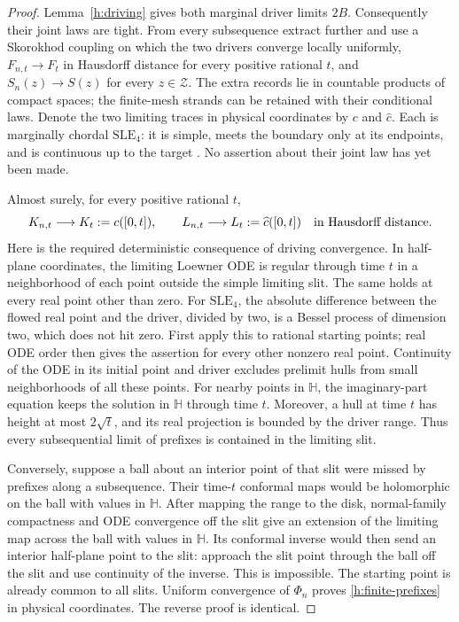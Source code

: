 \begin{proof}
Lemma~\ref{h:driving} gives both marginal driver limits $2B$.
Consequently their joint laws are tight. From every subsequence extract
further and use a Skorokhod coupling on which the two drivers converge
locally uniformly, $F_{n,t}\to F_t$ in Hausdorff distance for every
positive rational $t$, and $S_n(z)\to S(z)$ for every $z\in\mathcal Z$.
The extra records lie in countable products of compact spaces; the
finite-mesh strands can be retained with their conditional laws.
Denote the two limiting traces in physical coordinates by $c$ and
$\widehat c$. Each is marginally chordal $\mathrm{SLE}_4$: it is simple,
meets the boundary only at its endpoints, and is continuous up to the
target \cite{RohdeSchramm}. No assertion about their joint law has yet
been made.

Almost surely, for every positive rational $t$,
\begin{equation}\label{h:finite-prefixes}
 K_{n,t}\longrightarrow K_t:=c([0,t]),\qquad
 L_{n,t}\longrightarrow L_t:=\widehat c([0,t])
 \quad\hbox{in Hausdorff distance}.
\end{equation}
Here is the required deterministic consequence of driving convergence.
In half-plane coordinates, the limiting Loewner ODE is regular through
time $t$ in a neighborhood of each point outside the simple limiting
slit. The same holds at every real point other than zero. For
$\mathrm{SLE}_4$, the absolute difference between the flowed real point
and the driver, divided by two, is a Bessel process of dimension two,
which does not hit zero. First apply this to rational starting points;
real ODE order then gives the assertion for every other nonzero real
point. Continuity of the ODE in its initial point and driver excludes
prelimit hulls from small neighborhoods of all these points. For
nearby points in $\mathbb H$, the imaginary-part equation keeps the
solution in $\mathbb H$ through time $t$. Moreover, a hull at time $t$
has height at most $2\sqrt t$, and its real projection is bounded by
the driver range. Thus every subsequential limit of prefixes is
contained in the limiting slit.

Conversely, suppose a ball about an interior point of that slit were
missed by prefixes along a subsequence. Their time-$t$ conformal maps
would be holomorphic on the ball with values in $\mathbb H$.
After mapping the range to the disk, normal-family compactness and
ODE convergence off the slit give an extension of the limiting map
across the ball with values in $\mathbb H$. Its conformal inverse
would then send an interior half-plane point to the slit: approach
the slit point through the ball off the slit and use continuity of
the inverse. This is impossible. The starting point is already common
to all slits. Uniform convergence of $\Phi_n$ proves
\eqref{h:finite-prefixes} in physical coordinates. The reverse proof
is identical.


\end{proof}
